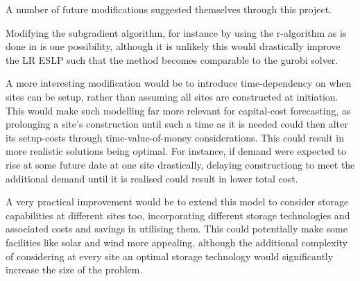 A number of future modifications suggested themselves through this project.

Modifying the subgradient algorithm, for instance by using the r-algorithm as is done in 
\cite{wu2006capacitated} is one possibility, although it is unlikely this would drastically
improve the LR ESLP such that the method becomes comparable to the gurobi solver.

A more interesting modification would be to introduce time-dependency on when sites can be setup, 
rather than assuming all sites are constructed at initiation. This would make such modelling far more
relevant for capital-cost forecasting, as prolonging a site's 
construction until such a time as it is needed could then alter its setup-costs through
time-value-of-money considerations. This could result in more realistic solutions being optimal.
For instance, if demand were expected to rise at some future date at one site drastically, delaying
constructiong to meet the additional demand until it is realised could result in lower
total cost.

A very practical improvement would be to extend this model to consider storage capabilities at different
sites too, incorporating different storage technologies and associated costs and savings in 
utilising them. This could potentially make some facilities like solar and wind more appealing,
although the additional complexity of considering at every site an optimal storage technology
would significantly increase the size of the problem.
